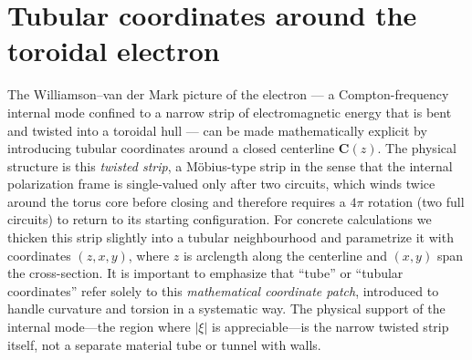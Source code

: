 \section{Tubular coordinates around the toroidal electron}
\label{app:tubular-electron}

The Williamson--van der Mark picture of the electron --- a
Compton-frequency internal mode confined to a narrow strip of
electromagnetic energy that is bent and twisted into a toroidal hull
--- can be made mathematically explicit by introducing tubular
coordinates around a closed centerline $\mathbf{C}(z)$. The physical
structure is this \emph{twisted strip}, a Möbius-type strip in the sense that the internal polarization frame is single-valued only after two circuits, which winds twice around the
torus core before closing and therefore requires a $4\pi$ rotation
(two full circuits) to return to its starting configuration. For
concrete calculations we thicken this strip slightly into a tubular
neighbourhood and parametrize it with coordinates $(z,x,y)$, where
$z$ is arclength along the centerline and $(x,y)$ span the
cross-section. It is important to emphasize that ``tube'' or ``tubular
coordinates'' refer solely to this \emph{mathematical coordinate
patch}, introduced to handle curvature and torsion in a systematic
way. The physical support of the internal mode---the region where
$|\xi|$ is appreciable---is the narrow twisted strip itself, not a
separate material tube or tunnel with walls.


